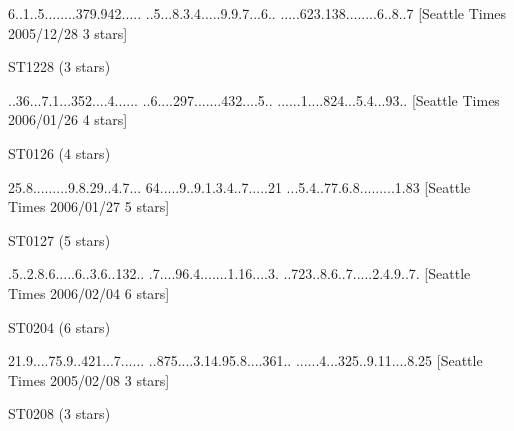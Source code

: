 \documentclass[twoside]{article}
\begin{document}
\renewcommand*{\puzzlefile}{st1228.sud}
\writepuzzle%
{6..1..5..}{......379}{.942.....}%
{..5...8.3}{.4.....9.}{9.7...6..}%
{.....623.}{138......}{..6..8..7}%
[Seattle Times 2005/12/28 3 stars]
\vfill
\begin{minipage}{0.95\linewidth}\begin{center}
ST1228 (3 stars) \\
\end{center}\end{minipage}

\renewcommand*{\puzzlefile}{st0126.sud}
\writepuzzle%
{..36...7.}{1...352..}{..4......}%
{..6....29}{7.......4}{32....5..}%
{......1..}{..824...5}{.4...93..}%
[Seattle Times 2006/01/26  4 stars]
\vfill
\begin{minipage}{0.95\linewidth}\begin{center}
ST0126 (4 stars) \\
\end{center}\end{minipage}

\renewcommand*{\puzzlefile}{st0127.sud}
\writepuzzle%
{25.8.....}{....9.8.2}{9..4.7...}%
{64.....9.}{.9.1.3.4.}{.7.....21}%
{...5.4..7}{7.6.8....}{.....1.83}%
[Seattle Times 2006/01/27  5 stars]
\vfill
\begin{minipage}{0.95\linewidth}\begin{center}
ST0127 (5 stars) \\
\end{center}\end{minipage}

\renewcommand*{\puzzlefile}{st0204.sud}
\writepuzzle%
{.5..2.8.6}{.....6..3}{.6..132..}%
{.7....96.}{4.......1}{.16....3.}%
{..723..8.}{6..7.....}{2.4.9..7.}%
[Seattle Times 2006/02/04 6 stars]
\vfill
\begin{minipage}{0.95\linewidth}\begin{center}
ST0204 (6 stars) \\
\end{center}\end{minipage}

\renewcommand*{\puzzlefile}{st0208.sud}
\writepuzzle%
{21.9....7}{5.9..421.}{..7......}%
{..875....}{3.14.95.8}{....361..}%
{......4..}{.325..9.1}{1....8.25}%
[Seattle Times 2005/02/08 3 stars]
\vfill
\begin{minipage}{0.95\linewidth}\begin{center}
ST0208 (3 stars) \\
\end{center}\end{minipage}
\end{document}
